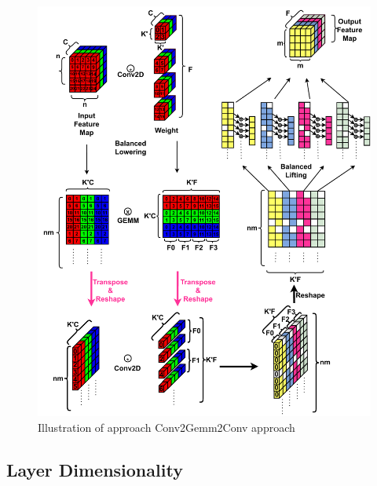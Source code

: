 \begin{figure}[]
    \centering
    \includegraphics[scale=0.5]{fig/ConvToGemmToConv.pdf}
    \caption{Illustration of approach Conv2Gemm2Conv approach}
    \label{fig:conv2gemm2conv}
\end{figure}

\subsection{Layer Dimensionality}
\label{chap:dda:dataflow_dse:indirect_mode:layer_dimentionality}

